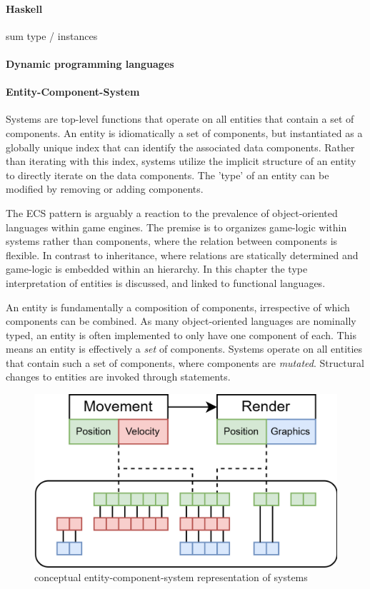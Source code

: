 \documentclass{article}
\begin{document}
\paragraph{Haskell}

sum type / instances

\paragraph{Dynamic programming languages}

\paragraph{Entity-Component-System}

Systems are top-level functions that operate on all entities that contain a set of components. 
An entity is idiomatically a set of components, but instantiated as a globally unique index that can identify the associated data components.
Rather than iterating with this index, systems utilize the implicit structure of an entity to directly iterate on the data components.  
The 'type' of an entity can be modified by removing or adding components.

The ECS pattern is arguably a reaction to the prevalence of object-oriented languages within game engines.
The premise is to organizes game-logic within systems rather than components, where the relation between components is flexible\cite{ecs-origin}.
In contrast to inheritance, where relations are statically determined and game-logic is embedded within an hierarchy.
In this chapter the type interpretation of entities is discussed, and linked to functional languages.

An entity is fundamentally a composition of components, irrespective of which components can be combined.
As many object-oriented languages are nominally typed, an entity is often implemented to only have one component of each.
This means an entity is effectively a {\it set} of components.
Systems operate on all entities that contain such a set of components, where components are {\it mutated}.
Structural changes to entities are invoked through statements.

\begin{figure}[ht]
    \centering
    \includegraphics[scale=0.2]{ecs}
    \caption{ conceptual entity-component-system representation of systems }
\end{figure}
\end{document}
